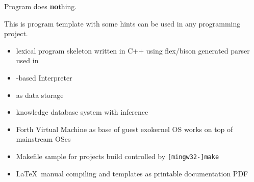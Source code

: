 
{\Huge Program does \textbf{no}thing.}
\bigskip

This is program template with some hints can be used in any programming project.
\bigskip

\begin{itemize}[nosep]
  \item 
{} lexical program skeleton written in C++ using flex/bison
generated parser used in
  \item 
{}-based Interpreter
  \item 
{} as data storage
  \item 
knowledge database system with inference
  \item 
{} Forth Virtual Machine as base of guest exokernel OS works on top of
mainstream OSes
  \item 
Makefile sample for projects build controlled by \verb|[mingw32-]make|
  \item 
\LaTeX\ manual compiling and templates as printable documentation PDF
\end{itemize}
